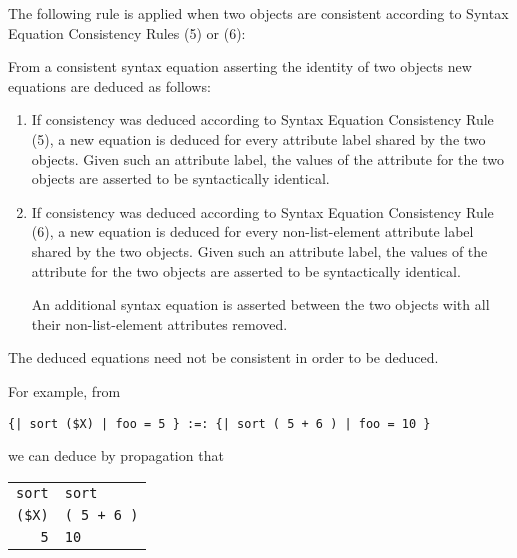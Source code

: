 \documentclass[12pt]{article}
\newcommand{\TT}[1]{{\tt \bfseries #1}}
\newcommand{\ikey}[2]{{\bf \em #1}\index{#2}}
\newenvironment{indpar}[1][0.3in]%
	{\begin{list}{}%
		     {\setlength{\itemsep}{0in}%
		      \setlength{\topsep}{0in}%
		      \setlength{\parsep}{1ex}%
		      \setlength{\labelwidth}{#1}%
		      \setlength{\leftmargin}{#1}%
		      \addtolength{\leftmargin}{\labelsep}}%
	 \item}%
	{\end{list}}
\begin{document}
The following rule is applied when two objects are consistent according
to Syntax Equation Consistency Rules (5) or (6):

\begin{indpar}
\begin{list}{}{}
\item[\ikey{Syntax Equation Propagation Rules}%
           {propagation rules!syntax equation}:]%
	   \label{SYNTAX-EQUATION-PROPAGATION-RULES}
From a consistent syntax equation asserting the identity
of two objects new equations are deduced as follows:
\begin{enumerate}
\item
If consistency was deduced according to Syntax Equation Consistency Rule (5),
a new equation is deduced for every attribute label shared by the two objects.
Given such an attribute label, the values
of the attribute for the two objects are asserted to be syntactically
identical.
\item
If consistency was deduced according to Syntax Equation Consistency Rule (6),
a new equation is deduced for every non-list-element
attribute label shared by the two objects.
Given such an attribute label, the values
of the attribute for the two objects are asserted to be syntactically
identical.

\medskip

An additional syntax equation is asserted between the two objects
with all their non-list-element attributes removed.
\end{enumerate}

The deduced equations need not be consistent in order to be deduced.
\end{list}
\end{indpar}

For example, from

\begin{center}
\verb/{| sort ($X) | foo = 5 } :=: {| sort ( 5 + 6 ) | foo = 10 }/
\end{center}

we can deduce by propagation that

\begin{center}
\begin{tabular}{r@\TT{~:=:~}l}
\verb/sort/ & \verb/sort/ \\
\verb/($X)/ & \verb/( 5 + 6 )/ \\
\verb/5/ & \verb/10/
\end{tabular}
\end{center}
\end{document}
